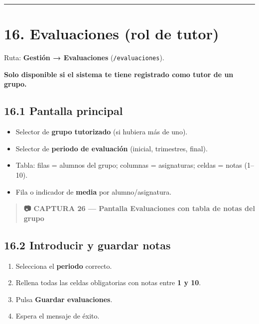 \documentclass[
  spanish,
  11pt,
]{report}
\providecommand{\tightlist}{%
  \setlength{\itemsep}{0pt}\setlength{\parskip}{0pt}}
\begin{document}
\begin{center}\rule{0.5\linewidth}{0.5pt}\end{center}

\section{16. Evaluaciones (rol de
tutor)}\label{evaluaciones-rol-de-tutor}

Ruta: \textbf{Gestión → Evaluaciones} (\texttt{/evaluaciones}).

\textbf{Solo disponible si el sistema te tiene registrado como tutor de
un grupo.}

\subsection{16.1 Pantalla principal}\label{pantalla-principal}

\begin{itemize}
\tightlist
\item
  Selector de \textbf{grupo tutorizado} (si hubiera más de uno).
\item
  Selector de \textbf{periodo de evaluación} (inicial, trimestres,
  final).
\item
  Tabla: filas = alumnos del grupo; columnas = asignaturas; celdas =
  notas (1--10).
\item
  Fila o indicador de \textbf{media} por alumno/asignatura.
\end{itemize}

\begin{quote}
\textbf{📷 CAPTURA 26 --- Pantalla Evaluaciones con tabla de notas del
grupo}
\end{quote}

\subsection{16.2 Introducir y guardar
notas}\label{introducir-y-guardar-notas}

\begin{enumerate}
\def\labelenumi{\arabic{enumi}.}
\tightlist
\item
  Selecciona el \textbf{periodo} correcto.
\item
  Rellena todas las celdas obligatorias con notas entre \textbf{1 y 10}.
\item
  Pulsa \textbf{Guardar evaluaciones}.
\item
  Espera el mensaje de éxito.
\end{enumerate}
\end{document}
